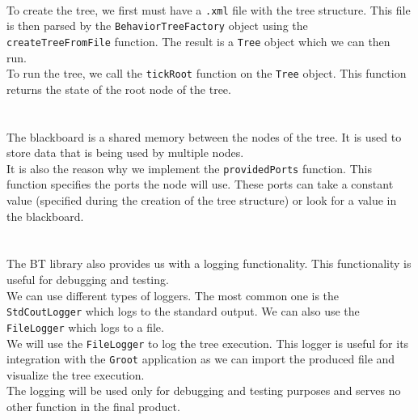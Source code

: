         \\
            To create the tree, we first must have a \texttt{.xml} file with the tree structure. This file is then parsed by the \texttt{BehaviorTreeFactory} object using the \texttt{createTreeFromFile} function. The result is a \texttt{Tree} object which we can then run.\\
            To run the tree, we call the \texttt{tickRoot} function on the \texttt{Tree} object. This function returns the state of the root node of the tree.\\\\
        \\
            The blackboard is a shared memory between the nodes of the tree. It is used to store data that is being used by multiple nodes.\\
            It is also the reason why we implement the \texttt{providedPorts} function. This function specifies the ports the node will use. These ports can take a constant value (specified during the creation of the tree structure) or look for a value in the blackboard.\\\\
        \\
            The BT library also provides us with a logging functionality. This functionality is useful for debugging and testing.\\
            We can use different types of loggers. The most common one is the \texttt{StdCoutLogger} which logs to the standard output. We can also use the \texttt{FileLogger} which logs to a file.\\
            We will use the \texttt{FileLogger} to log the tree execution. This logger is useful for its integration with the \texttt{Groot} application as we can import the produced file and visualize the tree execution.\\
            The logging will be used only for debugging and testing purposes and serves no other function in the final product.
    
    